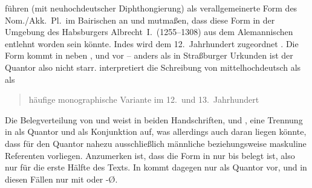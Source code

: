 \citet[396--397]{ksw2} führen  (mit neuhochdeutscher
Diphthongierung) als ver\-all\-gemeinerte Form des Nom./Akk.\ Pl.\ im
Bairischen an und mutmaßen, dass diese Form in der Umgebung des Habsburgers
Albrecht~I.\ (1255--1308) aus dem Alemannischen entlehnt worden sein könnte.
Indes wird \citet{kc:A1} dem 12.~Jahrhundert zugeordnet
\autocite{kcdigital,wolf:kckat}. Die Form   kommt in
\citet{kc:A1} neben ,  und  vor -- anders als
in Straßburger Urkunden ist der Quantor also nicht starr.
\citeauthor{wiesinger2001} interpretiert die Schreibung von mittelhochdeutsch
 als  als \blockcquote[103]{wiesinger2001}{häufige
mono\-graphische Variante \textelp{} im 12.\ und 13.~Jahrhundert}.

Die Belegverteilung von  und  weist in beiden
Handschriften, \citet{kc:A1} und \citet{kc:M}, eine Trennung in
 als Quantor und  als Konjunktion auf, was allerdings
auch daran liegen könnte, dass für den Quantor nahezu ausschließlich männliche
beziehungsweise maskuline Referenten vorliegen. Anzumerken ist, dass die Form
 in \citet{kc:A1} nur bis  belegt ist,
also nur für die erste Hälfte des Texts. In \citet{kc:M} kommt
 dagegen nur als Quantor vor, und in diesen Fällen nur mit 
oder -Ø.




	
